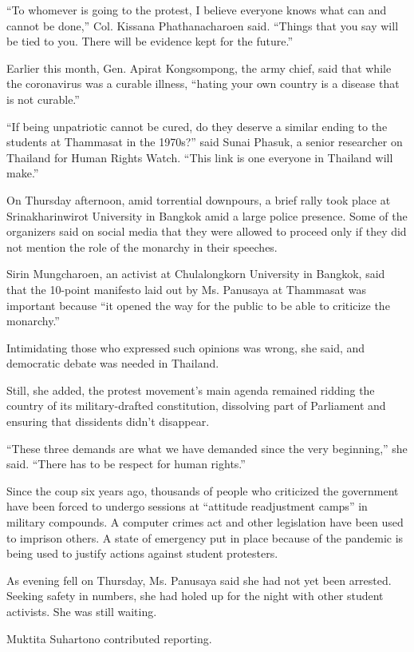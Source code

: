 ``To whomever is going to the protest, I believe everyone knows what can
and cannot be done,'' Col. Kissana Phathanacharoen said. ``Things that
you say will be tied to you. There will be evidence kept for the
future.''

Earlier this month, Gen. Apirat Kongsompong, the army chief, said that
while the coronavirus was a curable illness, ``hating your own country
is a disease that is not curable.''

``If being unpatriotic cannot be cured, do they deserve a similar ending
to the students at Thammasat in the 1970s?'' said Sunai Phasuk, a senior
researcher on Thailand for Human Rights Watch. ``This link is one
everyone in Thailand will make.''

On Thursday afternoon, amid torrential downpours, a brief rally took
place at Srinakharinwirot University in Bangkok amid a large police
presence. Some of the organizers said on social media that they were
allowed to proceed only if they did not mention the role of the monarchy
in their speeches.

Sirin Mungcharoen, an activist at Chulalongkorn University in Bangkok,
said that the 10-point manifesto laid out by Ms. Panusaya at Thammasat
was important because ``it opened the way for the public to be able to
criticize the monarchy.''

Intimidating those who expressed such opinions was wrong, she said, and
democratic debate was needed in Thailand.

Still, she added, the protest movement's main agenda remained ridding
the country of its military-drafted constitution, dissolving part of
Parliament and ensuring that dissidents didn't disappear.

``These three demands are what we have demanded since the very
beginning,'' she said. ``There has to be respect for human rights.''

Since the coup six years ago, thousands of people who criticized the
government have been forced to undergo sessions at ``attitude
readjustment camps'' in military compounds. A computer crimes act and
other legislation have been used to imprison others. A state of
emergency put in place because of the pandemic is being used to justify
actions against student protesters.

As evening fell on Thursday, Ms. Panusaya said she had not yet been
arrested. Seeking safety in numbers, she had holed up for the night with
other student activists. She was still waiting.

Muktita Suhartono contributed reporting.

